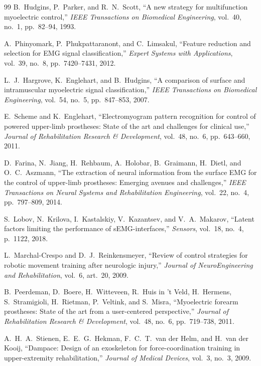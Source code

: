 \documentclass[12pt,a4paper]{article}
\begin{document}
\begin{thebibliography}{99}
B.~Hudgins, P.~Parker, and R.~N.~Scott, ``A new strategy for multifunction myoelectric control,'' \textit{IEEE Transactions on Biomedical Engineering}, vol.~40, no.~1, pp.~82--94, 1993.

A.~Phinyomark, P.~Phukpattaranont, and C.~Limsakul, ``Feature reduction and selection for EMG signal classification,'' \textit{Expert Systems with Applications}, vol.~39, no.~8, pp.~7420--7431, 2012.

L.~J.~Hargrove, K.~Englehart, and B.~Hudgins, ``A comparison of surface and intramuscular myoelectric signal classification,'' \textit{IEEE Transactions on Biomedical Engineering}, vol.~54, no.~5, pp.~847--853, 2007.

E.~Scheme and K.~Englehart, ``Electromyogram pattern recognition for control of powered upper-limb prostheses: State of the art and challenges for clinical use,'' \textit{Journal of Rehabilitation Research \& Development}, vol.~48, no.~6, pp.~643--660, 2011.

D.~Farina, N.~Jiang, H.~Rehbaum, A.~Holobar, B.~Graimann, H.~Dietl, and O.~C.~Aszmann, ``The extraction of neural information from the surface EMG for the control of upper-limb prostheses: Emerging avenues and challenges,'' \textit{IEEE Transactions on Neural Systems and Rehabilitation Engineering}, vol.~22, no.~4, pp.~797--809, 2014.

S.~Lobov, N.~Krilova, I.~Kastalskiy, V.~Kazantsev, and V.~A.~Makarov, ``Latent factors limiting the performance of sEMG-interfaces,'' \textit{Sensors}, vol.~18, no.~4, p.~1122, 2018.

L.~Marchal-Crespo and D.~J.~Reinkensmeyer, ``Review of control strategies for robotic movement training after neurologic injury,'' \textit{Journal of NeuroEngineering and Rehabilitation}, vol.~6, art.~20, 2009.

B.~Peerdeman, D.~Boere, H.~Witteveen, R.~Huis in 't Veld, H.~Hermens, S.~Stramigioli, H.~Rietman, P.~Veltink, and S.~Misra, ``Myoelectric forearm prostheses: State of the art from a user-centered perspective,'' \textit{Journal of Rehabilitation Research \& Development}, vol.~48, no.~6, pp.~719--738, 2011.

A.~H.~A.~Stienen, E.~E.~G.~Hekman, F.~C.~T.~van der Helm, and H.~van der Kooij, ``Dampace: Design of an exoskeleton for force-coordination training in upper-extremity rehabilitation,'' \textit{Journal of Medical Devices}, vol.~3, no.~3, 2009.


\end{thebibliography}
\end{document}

